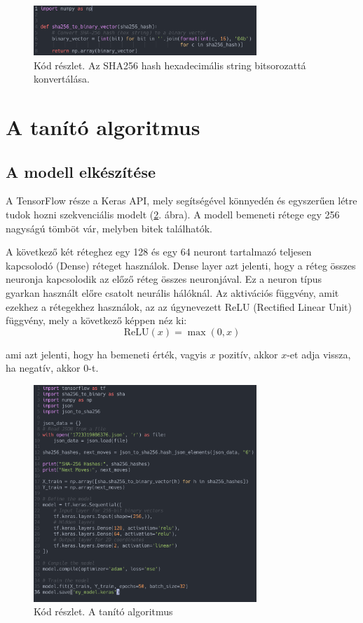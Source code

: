 \begin{figure}[h]
    \center
    \includegraphics[width=0.75\textwidth]{img/hash_to_bit.png}
    \caption{Kód részlet. Az SHA256 hash hexadecimális string bitsorozattá konvertálása.}
    \label{code:hash_to_bit}
\end{figure}

\section{A tanító algoritmus}

\subsection{A modell elkészítése}
A TensorFlow része a Keras API, mely segítségével könnyedén és egyszerűen létre tudok hozni szekvenciális modelt (\ref{code:tensor}. ábra). A modell bemeneti rétege egy 256 nagyságú tömböt vár, melyben bitek találhatók. 

A következő két réteghez egy 128 és egy 64 neuront tartalmazó teljesen kapcsolodó (Dense) réteget használok. Dense layer azt jelenti, hogy a réteg összes neuronja kapcsolodik az előző réteg összes neuronjával. Ez a neuron típus gyarkan használt előre csatolt neurális hálóknál.
Az aktivációs függvény, amit ezekhez a rétegekhez használok, az az úgynevezett 
ReLU (Rectified Linear Unit) függvény, mely a következő képpen néz ki:
\begin{equation}\label{eq:2}
\text{ReLU}(x) = \max(0, x) 
\end{equation}

ami azt jelenti, hogy ha bemeneti érték, vagyis $x$ pozitív, akkor $x$-et adja vissza, ha negatív, akkor 0-t. 


\begin{figure}[h]
    \includegraphics[width=0.75\textwidth]{img/Tensor.png}
    \caption{Kód részlet. A tanító algoritmus}
    \center
    \label{code:tensor}
\end{figure}

